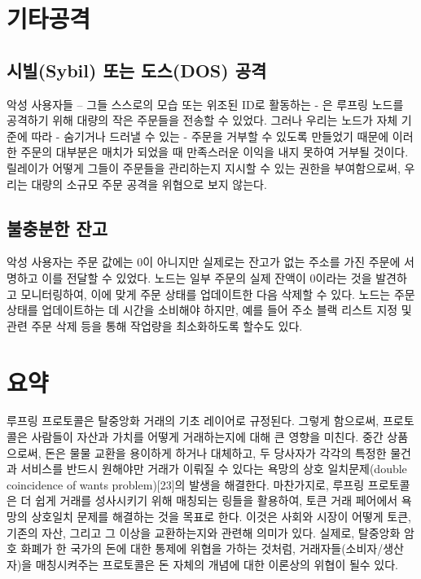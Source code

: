 \documentclass{article}
\begin{document}
\begin{multicols}{2}
\section{기타공격}

\subsection{시빌(Sybil) 또는 도스(DOS) 공격}
악성 사용자들 – 그들 스스로의 모습 또는 위조된 ID로 활동하는 - 은 루프링 노드를 공격하기 위해 대량의 작은 주문들을 전송할 수 있었다. 그러나 우리는 노드가 자체 기준에 따라 - 숨기거나 드러낼 수 있는 - 주문을 거부할 수 있도록 만들었기 때문에 이러한 주문의 대부분은 매치가 되었을 때 만족스러운 이익을 내지 못하여 거부될 것이다. 릴레이가 어떻게 그들이 주문들을 관리하는지 지시할 수 있는 권한을 부여함으로써, 우리는 대량의 소규모 주문 공격을 위협으로 보지 않는다.

\subsection{불충분한 잔고}
악성 사용자는 주문 값에는 0이 아니지만 실제로는 잔고가 없는 주소를 가진 주문에 서명하고 이를 전달할 수 있었다. 노드는 일부 주문의 실제 잔액이 0이라는 것을 발견하고 모니터링하여, 이에 맞게 주문 상태를 업데이트한 다음 삭제할 수 있다. 노드는 주문 상태를 업데이트하는 데 시간을 소비해야 하지만, 예를 들어 주소 블랙 리스트 지정 및 관련 주문 삭제 등을 통해 작업량을 최소화하도록 할수도 있다.



\section{요약}
루프링 프로토콜은 탈중앙화 거래의 기초 레이어로 규정된다. 그렇게 함으로써, 프로토콜은 사람들이 자산과 가치를 어떻게 거래하는지에 대해 큰 영향을 미친다. 중간 상품으로써, 돈은 물물 교환을 용이하게 하거나 대체하고, 두 당사자가 각각의 특정한 물건과 서비스를 반드시 원해야만 거래가 이뤄질 수 있다는 욕망의 상호 일치문제(double coincidence of wants problem)[23]의 발생을 해결한다. 마찬가지로, 루프링 프로토콜은 더 쉽게 거래를 성사시키기 위해 매칭되는 링들을 활용하여, 토큰 거래 페어에서 욕망의 상호일치 문제를 해결하는 것을 목표로 한다. 이것은 사회와 시장이 어떻게 토큰, 기존의 자산, 그리고 그 이상을 교환하는지와 관련해 의미가 있다. 실제로, 탈중앙화 암호 화폐가 한 국가의 돈에 대한 통제에 위협을 가하는 것처럼, 거래자들(소비자/생산자)을 매칭시켜주는 프로토콜은 돈 자체의 개념에 대한 이론상의 위협이 될수 있다.


\end{multicols}
\end{document}
